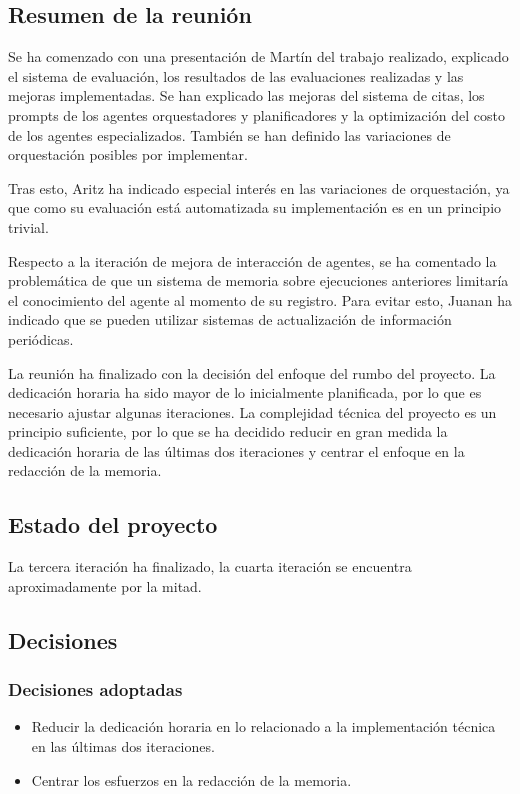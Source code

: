 \subsection{Resumen de la reunión}
Se ha comenzado con una presentación de Martín del trabajo realizado, explicado el sistema de evaluación, los resultados de las evaluaciones realizadas y las mejoras implementadas. Se han explicado las mejoras del sistema de citas, los prompts de los agentes orquestadores y planificadores y la optimización del costo de los agentes especializados. También se han definido las variaciones de orquestación posibles por implementar.

Tras esto, Aritz ha indicado especial interés en las variaciones de orquestación, ya que como su evaluación está automatizada su implementación es en un principio trivial.

Respecto a la iteración de mejora de interacción de agentes, se ha comentado la problemática de que un sistema de memoria sobre ejecuciones anteriores limitaría el conocimiento del agente al momento de su registro. Para evitar esto, Juanan ha indicado que se pueden utilizar sistemas de actualización de información periódicas. 

La reunión ha finalizado con la decisión del enfoque del rumbo del proyecto. La dedicación horaria ha sido mayor de lo inicialmente planificada, por lo que es necesario ajustar algunas iteraciones. La complejidad técnica del proyecto es un principio suficiente, por lo que se ha decidido reducir en gran medida la dedicación horaria de las últimas dos iteraciones y centrar el enfoque en la redacción de la memoria.

\subsection{Estado del proyecto}
La tercera iteración ha finalizado, la cuarta iteración se encuentra aproximadamente por la mitad.

\subsection{Decisiones}
\subsubsection{Decisiones adoptadas}
\begin{itemize}
    \item Reducir la dedicación horaria en lo relacionado a la implementación técnica en las últimas dos iteraciones.
    \item Centrar los esfuerzos en la redacción de la memoria.
\end{itemize}

